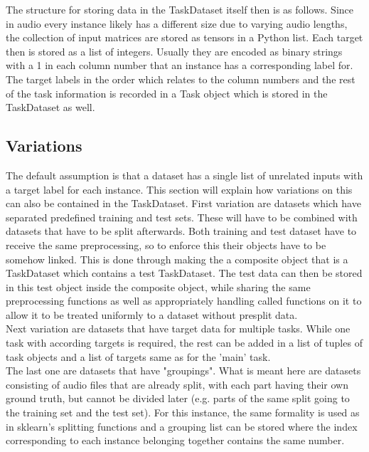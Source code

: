 The structure for storing data in the TaskDataset itself then is as follows. Since in audio every instance likely has a different size due to varying audio lengths, the collection of input matrices are stored as tensors in a Python list. Each target then is stored as a list of integers. Usually they are encoded as binary strings with a 1 in each column number that an instance has a corresponding label for. The target labels in the order which relates to the column numbers and the rest of the task information is recorded in a Task object which is stored in the TaskDataset as well. \\

\subsection{Variations}


The default assumption is that a dataset has a single list of unrelated inputs with a target label for each instance. This section will explain how variations on this can also be contained in the TaskDataset. First variation are datasets which have separated predefined training and test sets. These will have to be combined with datasets that have to be split afterwards. Both training and test dataset have to receive the same preprocessing, so to enforce this their objects have to be somehow linked. This is done through making the a composite object that is a TaskDataset which contains a test TaskDataset. The test data can then be stored in this test object inside the composite object, while sharing the same preprocessing functions as well as appropriately handling called functions on it to allow it to be treated uniformly to a dataset without presplit data. \\

Next variation are datasets that have target data for multiple tasks. While one task with according targets is required, the rest can be added in a list of tuples of task objects and a list of targets same as for the 'main' task. \\

The last one are datasets that have "groupings". What is meant here are datasets consisting of audio files that are already split, with each part having their own ground truth, but cannot be divided later (e.g. parts of the same split going to the training set and the test set). For this instance, the same formality is used as in sklearn's splitting functions and a grouping list can be stored where the index corresponding to each instance belonging together contains the same number. \\

